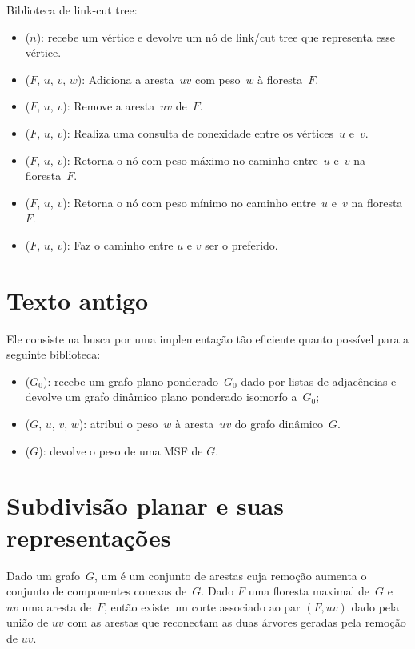 Biblioteca de link-cut tree:
\begin{itemize}
\item \linkcutCreate($n$): recebe um vértice e devolve um nó de link/cut tree que representa esse vértice.
\item \linkcutAddEdge($F$, $u$, $v$, $w$): Adiciona a aresta~$uv$ com peso~$w$ à floresta~$F$.
\item \linkcutDelEdge($F$, $u$, $v$): Remove a aresta~$uv$ de~$F$.
\item \linkcutQuery($F$, $u$, $v$): Realiza uma consulta de conexidade entre os vértices~$u$ e~$v$.
\item \linkcutMax($F$, $u$, $v$): Retorna o nó com peso máximo no caminho entre~$u$ e~$v$ na floresta~$F$.
\item \linkcutMin($F$, $u$, $v$): Retorna o nó com peso mínimo no caminho entre~$u$ e~$v$ na floresta~$F$.
\item \linkcutPath($F$, $u$, $v$): Faz o caminho entre $u$ e $v$ ser o preferido.
\end{itemize}

\section{Texto antigo}

Ele consiste na busca por uma implementação tão eficiente quanto possível para a seguinte biblioteca:

\begin{itemize}
\item \MSFCreate($G_0$): recebe um grafo plano ponderado~$G_0$ dado por listas de adjacências e devolve um grafo dinâmico plano ponderado isomorfo a~$G_0$; 
\item \MSFupdate($G$, $u$, $v$, $w$): atribui o peso~$w$ à aresta~$uv$ do grafo dinâmico~$G$.
\item \MSFweight($G$): devolve o peso de uma MSF de $G$.
\end{itemize}


\section{Subdivisão planar e suas representações}


Dado um grafo~$G$, um  é um conjunto de arestas cuja remoção aumenta o conjunto de componentes conexas de~$G$.
Dado $F$ uma floresta maximal de~$G$ e~$uv$ uma aresta de~$F$, então existe um corte associado ao par $(F, uv)$ dado pela união de $uv$ com as arestas que reconectam as duas árvores geradas pela remoção de $uv$.


